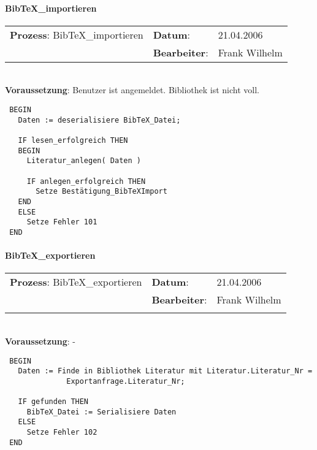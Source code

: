 \paragraph{BibTeX\_importieren}
\begin{tabular}[t]{p{9.5cm}ll}
\textbf{Prozess}: BibTeX\_importieren  	&\textbf{Datum}:      &21.04.2006\\
					&\textbf{Bearbeiter}: &Frank Wilhelm\\
\end{tabular}

\hrulefill\\
\textbf{Voraussetzung}: Benutzer ist angemeldet. Bibliothek ist nicht voll.
\begin{verbatim}
 BEGIN
   Daten := deserialisiere BibTeX_Datei;
   
   IF lesen_erfolgreich THEN
   BEGIN
     Literatur_anlegen( Daten )
     
     IF anlegen_erfolgreich THEN
       Setze Bestätigung_BibTeXImport
   END
   ELSE
     Setze Fehler 101
 END
\end{verbatim}
\hrulefill


\paragraph{BibTeX\_exportieren}
\begin{tabular}[t]{p{9.5cm}ll}
\textbf{Prozess}: BibTeX\_exportieren  	&\textbf{Datum}:      &21.04.2006\\
					&\textbf{Bearbeiter}: &Frank Wilhelm\\\\
\end{tabular}

\hrulefill\\
\textbf{Voraussetzung}: -
\begin{verbatim}
 BEGIN
   Daten := Finde in Bibliothek Literatur mit Literatur.Literatur_Nr = 
              Exportanfrage.Literatur_Nr;
  
   IF gefunden THEN
     BibTeX_Datei := Serialisiere Daten
   ELSE
     Setze Fehler 102
 END
\end{verbatim}

\hrulefill

